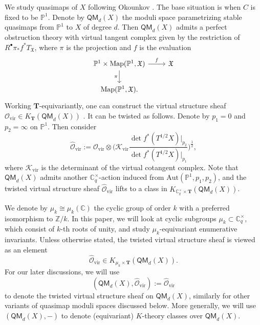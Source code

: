 \documentclass[reqno]{amsart}
\numberwithin{equation}{section}
\numberwithin{equation}{section}
\numberwithin{equation}{section}
\theoremstyle{definition}
\theoremstyle{remark}
\theoremstyle{remark}
\begin{document}
We study quasimaps of $X$ following Okounkov \cite{Oko17}. The base situation is when $C$ is fixed to be $\mathbb{P}^1$. Denote by $\mathsf{QM}_d(X)$ the moduli space parametrizing stable quasimaps from $\mathbb{P}^1$ to $X$ of degree $d$. Then $\mathsf{QM}_d(X)$ admits a perfect obstruction theory \cite{behrend-fantechi} with virtual tangent complex given by the restriction of $R^{\bullet}\pi_*f^*T_{\mathfrak{X}}$, where $\pi$ is the projection and $f$ is the evaluation
\begin{equation}
    \begin{tikzcd}
{\mathbb{P}^1 \times \mathrm{Map}(\mathbb{P}^1, \mathfrak{X})} \arrow[d, "\pi"'] \arrow[r, "f"] & \mathfrak{X} \\
{\mathrm{Map}(\mathbb{P}^1, \mathfrak{X}).}                                                      &             
\end{tikzcd}
\end{equation}
Working $\mathbf{T}$-equivariantly, one can construct the virtual structure sheaf $\mathcal{O}_{\mathrm{vir}} \in K_{\mathbf{T}}(\mathsf{QM}_d(X))$ \cite{lee-K}. It can be twisted as follows. Denote by $p_1 = 0$ and $p_2 = \infty$ on $\mathbb{P}^1$. Then consider
\begin{equation}\label{eqn:o-twist}
    \hat{\mathcal{O}}_{\mathrm{vir}} := \mathcal{O}_{\mathrm{vir}} \otimes \big(\mathcal{K}_{\mathrm{vir}} \frac{\det f^* (T^{1/2}X)|_{p_2}}{\det f^* (T^{1/2}X)|_{p_1}}\big)^{\frac12},
\end{equation}
where $\mathcal{K}_{\mathrm{vir}}$ is the determinant of the virtual cotangent complex. Note that $\mathsf{QM}_d(X)$ admits another $\mathbb{C}^{\times}_q$-action induced from $\mathrm{Aut}(\mathbb{P}^1, p_1, p_2)$, and the twisted virtual structure sheaf $\hat{\mathcal{O}}_{\mathrm{vir}}$ lifts to a class in $K_{\mathbb{C}^{\times}_q \times \mathbf{T}}(\mathsf{QM}_d(X))$.

We denote by $\mu_k \cong \mu_k(\mathbb{C})$ the cyclic group of order $k$ with a preferred isomorphism to $\mathbb{Z}/k$. In this paper, we will look at cyclic subgroups $\mu_k \subset \mathbb{C}^{\times}_q$, which consist of $k$-th roots of unity, and study $\mu_k$-equivariant enumerative invariants. Unless otherwise stated, the twisted virtual structure sheaf is viewed as an element
\begin{equation}
    \hat{\mathcal{O}}_{\mathrm{vir}} \in K_{\mu_{k} \times \mathbf{T}}(\mathsf{QM}_d(X)).
\end{equation}
For our later discussions, we will use
\begin{equation}
    (\mathsf{QM}_d(X), \hat{\mathcal{O}}_{\mathrm{vir}}) := \hat{\mathcal{O}}_{\mathrm{vir}}
\end{equation}
to denote the twisted virtual structure sheaf on $\mathsf{QM}_d(X)$, similarly for other variants of quasimap moduli spaces discussed below. More generally, we will use $(\mathsf{QM}_d(X), -)$ to denote (equivariant) $K$-theory classes over $\mathsf{QM}_d(X)$.
\end{document}
